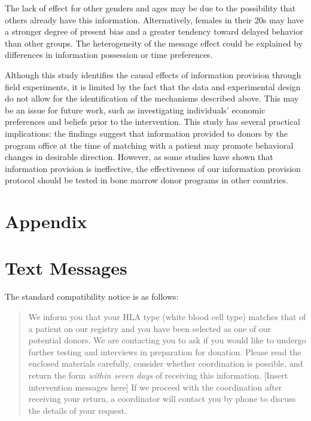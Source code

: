 \documentclass[12pt, a4paper]{article}
\begin{document}
The lack of effect for other genders and ages may be due to the possibility that others already have this information. Alternatively, females in their 20s may have a stronger degree of present bias and a greater tendency toward delayed behavior than other groups. The heterogeneity of the message effect could be explained by differences in information possession or time preferences.

Although this study identifies the causal effects of information provision through field experiments, it is limited by the fact that the data and experimental design do not allow for the identification of the mechanisms described above. This may be an issue for future work, such as investigating individuals' economic preferences and beliefs prior to the intervention. This study has several practical implications: the findings suggest that information provided to donors by the program office at the time of matching with a patient may promote behavioral changes in desirable direction. However, as some studies \citep[for example,][]{Switzer2018} have shown that information provision is ineffective, the effectiveness of our information provision protocol should be tested in bone marrow donor programs in other countries.

\clearpage

\appendix

\hypertarget{appendix}{%
\section*{Appendix}\label{appendix}}

\hypertarget{message}{%
\section{Text Messages}\label{message}}

The standard compatibility notice is as follows:

\begin{quote}
We inform you that your HLA type (white blood cell type) matches that of a patient on our registry and you have been selected as one of our potential donors. We are contacting you to ask if you would like to undergo further testing and interviews in preparation for donation. Please read the enclosed materials carefully, consider whether coordination is possible, and return the form \emph{within seven days} of receiving this information. {[}Insert intervention messages here{]} If we proceed with the coordination after receiving your return, a coordinator will contact you by phone to discuss the details of your request.
\end{quote}
\end{document}
